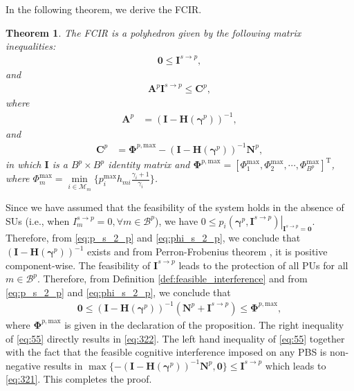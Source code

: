 \documentclass[journal,twoside]{IEEEtran}
\newcommand{\B}{\mathcal{B}}
\newcommand{\M}{\mathcal{M}}
\newcommand{\Phibold}{\boldsymbol{\Phi}}
\newcommand{\gammabold}{\boldsymbol{\gamma}}
\newcommand{\hup}[2]{h_{#1 #2}}
\newtheorem {theorem}{Theorem}
\begin{document}
	In the following theorem, we derive the FCIR.
	\begin{theorem}
	\label{th:FCIR}
		The FCIR is a polyhedron given by the following matrix inequalities:
\begin{align}
	\label{eq:321}
		\mathbf{0} \leq \mathbf{I}^{s\rightarrow p},
	\end{align}
	and
	\begin{align}
	\label{eq:322}
		\mathbf{A}^{\!p}  \mathbf{I}^{s\rightarrow p}  
		\leq \mathbf{C}^p,
	\end{align}
		where 
		\begin{align}
		\label{eq:A_feas_coef}
			\mathbf{A}^{p}&=\left( \mathbf{I-H}(\gammabold^p) \right)^{-1},
		\end{align}
		and
		\begin{align}
		\label{eq:B_feas_coef}
			\mathbf{C}^{p}&=\Phibold^{p,\mathrm{max}} - \left( \mathbf{I-H}(\gammabold^p) \right)^{-1}  \mathbf{N}^p,
		\end{align}
		in which $\mathbf{I}$ is a $B^p \times B^{p}$ identity matrix and $\Phibold^{p,\mathrm{max}}=[\Phi_1^{\mathrm{max}},\Phi_2^{\mathrm{max}},\cdots,\Phi_{B^{p}}^{\mathrm{max}}]^{\mathrm{T}}$,
		where $\Phi^{\mathrm{max}}_m= \min\limits_{i\in\M_{m}} {\{p_i^\mathrm{max} \hup{m}{i}} \frac{\gamma_i+1}{\gamma_i}\}$.
	\end{theorem}
	\begin{IEEEproof}
		Since we have assumed that the feasibility of the system holds in the absence of SUs (i.e., when $I^{s\rightarrow p}_m=0, \forall m\in\B^{p}$), we have $\left. 0\leq p_i(\gammabold^{p},\mathbf{I}^{s \rightarrow p})\right|_{ \mathbf{I}^{s\rightarrow p} = \mathbf{0}}$. Therefore, from \eqref{eq:p_s_2_p} and \eqref{eq:phi_s_2_p}, we conclude that $\left( \mathbf{I-H}(\gammabold^{p}) \right)^{-1}$ exists and from Perron-Frobenius theorem \cite{perron}, it is positive component-wise. The feasibility of $\mathbf{I}^{s\rightarrow p}$ leads to the protection of all PUs for all $m\in\B^{p}$. Therefore, from Definition \ref{def:feasible_interference} and from \eqref{eq:p_s_2_p} and \eqref{eq:phi_s_2_p}, we conclude that
		\begin{align}
			\label{eq:55}
			\mathbf{0}\leq \left( \mathbf{I-H}(\gammabold^{p}) \right)^{-1} \left( \mathbf{N}^{p} + \mathbf{I}^{s \rightarrow p} \right) \leq \Phibold^{p,\mathrm{max}},
		\end{align}
		where $\Phibold^{p,\mathrm{max}}$ is given in the declaration of the proposition. The right inequality of \eqref{eq:55} directly results in \eqref{eq:322}. The left hand inequality of \eqref{eq:55} together with the fact that the feasible cognitive interference imposed on any PBS is non-negative results in $\max\{-\left( \mathbf{I-H}(\gammabold^{p}) \right)^{-1}  \mathbf{N}^{p},\mathbf{0}\}\leq  \mathbf{I}^{s \rightarrow p} $ which leads to \eqref{eq:321}. This completes the proof.
	\end{IEEEproof}
	
\end{document}
